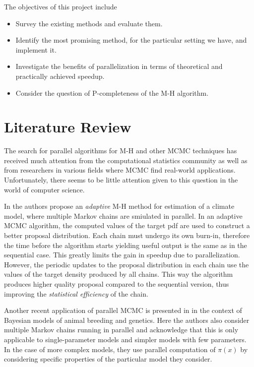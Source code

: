 \documentclass[11pt]{article}       %
\begin{document}
The objectives of this project include
\begin{itemize}
\item Survey the existing methods and evaluate them.
\item Identify the most promising method, for the particular setting we have, and implement it.
\item Investigate the benefits of parallelization in terms of theoretical and
     practically achieved speedup.
\item Consider the question of P-completeness of the M-H algorithm.
\end{itemize}


\section{Literature Review} \label{litrev}

The search for parallel algorithms for M-H and other MCMC techniques has received
much attention from the computational statistics community as well as from 
researchers in various fields where MCMC find real-world applications.  
Unfortunately, there seems to be little attention given to this question 
in the world of computer science.

In \cite{solonen2012efficient} the authors propose an \emph{adaptive} M-H
method for estimation of a climate model, where multiple Markov chains are
smiulated in parallel.  In an adaptive MCMC algorithm, the computed values of
the target pdf are used to construct a better proposal distribution.  Each
chain must undergo its own burn-in, therefore the time before the algorithm
starts yielding useful output is the same as in the sequential case.  This
greatly limits the gain in speedup due to parallelization.  However, the
periodic updates to the proposal distribution in each chain use the values of
the target density produced by all chains.  This way the algorithm produces
higher quality proposal compared to the sequential version, thus improving the
\emph{statistical efficiency} of the chain.

Another recent application of parallel MCMC is presented in \cite{wu2012parallel}
in the context of Bayesian models of animal breeding and genetics.
Here the authors also consider multiple Markov chains running in parallel and acknowledge 
that this is only applicable to single-parameter models and simpler models with 
few parameters.  In the case of more complex models, they use parallel 
computation of $\pi(x)$ by considering specific properties of the 
particular model they consider.

\cite{byrd2008reducing}








\end{document}
